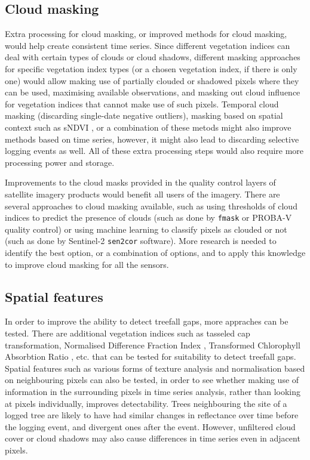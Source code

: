 \documentclass[a4paper,12pt]{scrbook}
\begin{document}
\subsection{Cloud masking}

Extra processing for cloud masking, or improved methods for cloud masking, would help create consistent time series. Since different vegetation indices can deal with certain types of clouds or cloud shadows, different masking approaches for specific vegetation index types (or a chosen vegetation index, if there is only one) would allow making use of partially clouded or shadowed pixels where they can be used, maximising available observations, and masking out cloud influence for vegetation indices that cannot make use of such pixels. Temporal cloud masking (discarding single-date negative outliers), masking based on spatial context such as sNDVI \citep{hamunyela_using_2016}, or a combination of these metods might also improve methods based on time series, however, it might also lead to discarding selective logging events as well. All of these extra processing steps would also require more processing power and storage.

Improvements to the cloud masks provided in the quality control layers of satellite imagery products would benefit all users of the imagery. There are several approaches to cloud masking available, such as using thresholds of cloud indices to predict the presence of clouds (such as done by \texttt{fmask} or PROBA-V quality control) or using machine learning to classify pixels as clouded or not (such as done by Sentinel-2 \texttt{sen2cor} software). More research is needed to identify the best option, or a combination of options, and to apply this knowledge to improve cloud masking for all the sensors.

\subsection{Spatial features}

In order to improve the ability to detect treefall gaps, more appraches can be tested. There are additional vegetation indices such as tasseled cap transformation, Normalised Difference Fraction Index \citep{souza_combining_2005}, Transformed Chlorophyll Absorbtion Ratio \citep{haboudane_integrated_2002}, etc. that can be tested for suitability to detect treefall gaps. Spatial features such as various forms of texture analysis and normalisation based on neighbouring pixels can also be tested, in order to see whether making use of information in the surrounding pixels in time series analysis, rather than looking at pixels individually, improves detectability. Trees neighbouring the site of a logged tree are likely to have had similar changes in reflectance over time before the logging event, and divergent ones after the event. However, unfiltered cloud cover or cloud shadows may also cause differences in time series even in adjacent pixels.
\end{document}
